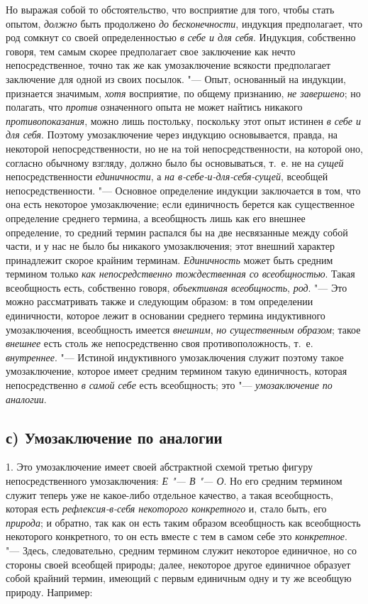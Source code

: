 {{Но выражая собой то обстоятельство, что восприятие для того,
чтобы стать опытом, {\em должно}
быть продолжено {\em до
бесконечности}, индукция предполагает, что род сомкнут со
своей определенностью {\em в себе и для
себя}. Индукция, собственно говоря, тем самым скорее
предполагает свое заключение как нечто непосредственное, точно так же как
умозаключение всякости предполагает заключение для одной из своих посылок.
"--- Опыт, основанный на индукции, признается значимым,
{\em хотя} восприятие, по
общему признанию, {\em не завершено};
но полагать, что
{\em против} означенного
опыта не может найтись никакого
{\em противопоказания},
можно лишь постольку, поскольку этот опыт истинен
{\em в себе и для себя}.
Поэтому умозаключение через индукцию основывается, правда, на
некоторой непосредственности, но не на той непосредственности, на которой
оно, согласно обычному взгляду, должно было бы основываться, т.~е. не на
{\em сущей}
непосредственности
{\em единичности}, а
{\em на в-себе-и-для-себя-сущей},
всеобщей непосредственности. "--- Основное
определение индукции заключается в том, что она есть некоторое
умозаключение; если единичность берется как существенное определение
среднего термина, а всеобщность лишь как его внешнее определение, то
средний термин распался бы на две несвязанные между собой части, и у нас не
было бы никакого умозаключения; этот внешний характер принадлежит скорое
крайним терминам. {\em Единичность}
может быть средним термином только
{\em как непосредственно тождественная
со всеобщностью}. Такая всеобщность есть, собственно говоря,
{\em объективная всеобщность},
{\em род}. "--- Это можно
рассматривать также и следующим образом: в том определении единичности,
которое лежит в основании среднего термина индуктивного умозаключения,
всеобщность имеется {\em внешним},
{\em но существенным образом};
такое {\em внешнее}
есть столь же непосредственно своя противоположность, т.~е.
{\em внутреннее}. "---
Истиной индуктивного умозаключения служит поэтому
такое умозаключение, которое имеет средним термином такую
единичность, которая непосредственно
{\em в самой себе} есть
всеобщность; это "--- {\em умозаключение по
аналогии}.

\subsection[с) Умозаключение по аналогии]{с) Умозаключение по аналогии}
1. Это умозаключение имеет своей абстрактной схемой третью
фигуру непосредственного умозаключения:
{\em Е "--- В
"--- О}. Но его средним термином служит теперь
уже не какое-либо отдельное качество, а такая всеобщность, которая есть
{\em рефлексия-в-себя некоторого
конкретного} и, стало быть, его
{\em природа}; и обратно,
так как он есть таким образом всеобщность как всеобщность некоторого
конкретного, то он есть вместе с тем в самом себе это
{\em конкретное}. "---
Здесь, следовательно, средним термином служит некоторое
единичное, но со стороны своей всеобщей природы; далее, некоторое другое
единичное образует собой крайний термин, имеющий с первым единичным одну и
ту же всеобщую природу. Например:

}}
